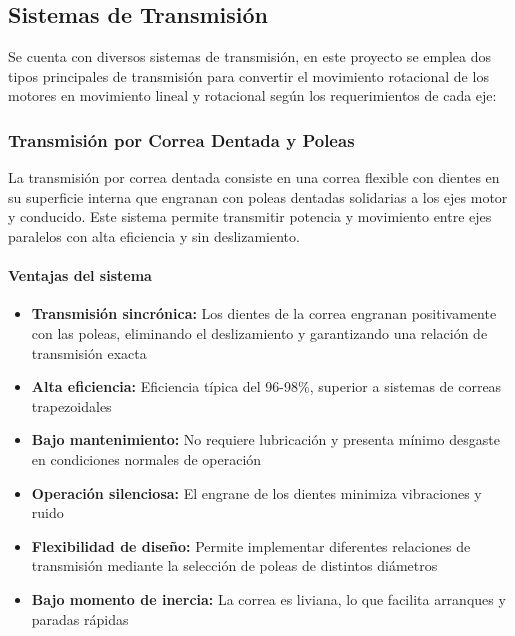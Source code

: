 
\subsection{Sistemas de Transmisión}

Se cuenta con diversos sistemas de transmisión, en este proyecto se emplea dos tipos principales de transmisión para convertir el movimiento rotacional de los motores en movimiento lineal y rotacional según los requerimientos de cada eje:

\subsubsection{Transmisión por Correa Dentada y Poleas}

La transmisión por correa dentada consiste en una correa flexible con dientes en su superficie interna que engranan con poleas dentadas solidarias a los ejes motor y conducido. Este sistema permite transmitir potencia y movimiento entre ejes paralelos con alta eficiencia y sin deslizamiento.

\paragraph{Ventajas del sistema}
\begin{itemize}
    \item \textbf{Transmisión sincrónica:} Los dientes de la correa engranan positivamente con las poleas, eliminando el deslizamiento y garantizando una relación de transmisión exacta
    \item \textbf{Alta eficiencia:} Eficiencia típica del 96-98\%, superior a sistemas de correas trapezoidales
    \item \textbf{Bajo mantenimiento:} No requiere lubricación y presenta mínimo desgaste en condiciones normales de operación
    \item \textbf{Operación silenciosa:} El engrane de los dientes minimiza vibraciones y ruido
    \item \textbf{Flexibilidad de diseño:} Permite implementar diferentes relaciones de transmisión mediante la selección de poleas de distintos diámetros
    \item \textbf{Bajo momento de inercia:} La correa es liviana, lo que facilita arranques y paradas rápidas
\end{itemize}


